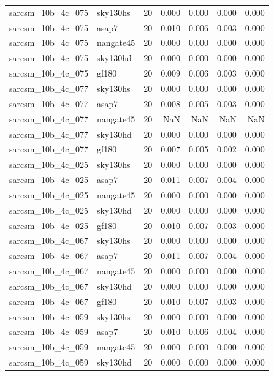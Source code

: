 \begin{tabular}{llrrrrr}
sarcsm\_10b\_4c\_075 & sky130hs & 20 & 0.000 & 0.000 & 0.000 & 0.000 \\
sarcsm\_10b\_4c\_075 & asap7 & 20 & 0.010 & 0.006 & 0.003 & 0.000 \\
sarcsm\_10b\_4c\_075 & nangate45 & 20 & 0.000 & 0.000 & 0.000 & 0.000 \\
sarcsm\_10b\_4c\_075 & sky130hd & 20 & 0.000 & 0.000 & 0.000 & 0.000 \\
sarcsm\_10b\_4c\_075 & gf180 & 20 & 0.009 & 0.006 & 0.003 & 0.000 \\
sarcsm\_10b\_4c\_077 & sky130hs & 20 & 0.000 & 0.000 & 0.000 & 0.000 \\
sarcsm\_10b\_4c\_077 & asap7 & 20 & 0.008 & 0.005 & 0.003 & 0.000 \\
sarcsm\_10b\_4c\_077 & nangate45 & 20 & NaN & NaN & NaN & NaN \\
sarcsm\_10b\_4c\_077 & sky130hd & 20 & 0.000 & 0.000 & 0.000 & 0.000 \\
sarcsm\_10b\_4c\_077 & gf180 & 20 & 0.007 & 0.005 & 0.002 & 0.000 \\
sarcsm\_10b\_4c\_025 & sky130hs & 20 & 0.000 & 0.000 & 0.000 & 0.000 \\
sarcsm\_10b\_4c\_025 & asap7 & 20 & 0.011 & 0.007 & 0.004 & 0.000 \\
sarcsm\_10b\_4c\_025 & nangate45 & 20 & 0.000 & 0.000 & 0.000 & 0.000 \\
sarcsm\_10b\_4c\_025 & sky130hd & 20 & 0.000 & 0.000 & 0.000 & 0.000 \\
sarcsm\_10b\_4c\_025 & gf180 & 20 & 0.010 & 0.007 & 0.003 & 0.000 \\
sarcsm\_10b\_4c\_067 & sky130hs & 20 & 0.000 & 0.000 & 0.000 & 0.000 \\
sarcsm\_10b\_4c\_067 & asap7 & 20 & 0.011 & 0.007 & 0.004 & 0.000 \\
sarcsm\_10b\_4c\_067 & nangate45 & 20 & 0.000 & 0.000 & 0.000 & 0.000 \\
sarcsm\_10b\_4c\_067 & sky130hd & 20 & 0.000 & 0.000 & 0.000 & 0.000 \\
sarcsm\_10b\_4c\_067 & gf180 & 20 & 0.010 & 0.007 & 0.003 & 0.000 \\
sarcsm\_10b\_4c\_059 & sky130hs & 20 & 0.000 & 0.000 & 0.000 & 0.000 \\
sarcsm\_10b\_4c\_059 & asap7 & 20 & 0.010 & 0.006 & 0.004 & 0.000 \\
sarcsm\_10b\_4c\_059 & nangate45 & 20 & 0.000 & 0.000 & 0.000 & 0.000 \\
sarcsm\_10b\_4c\_059 & sky130hd & 20 & 0.000 & 0.000 & 0.000 & 0.000 \\

\end{tabular}
